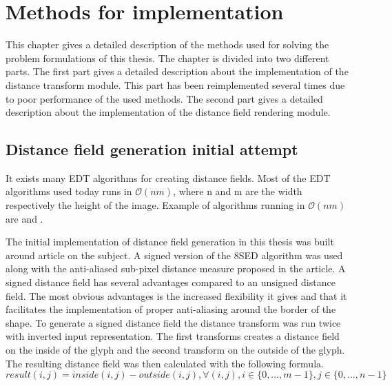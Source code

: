 \chapter{Methods for implementation}\label{cha:method_implementation}
This chapter gives a detailed description of the methods used for solving the problem formulations of this thesis. The chapter is divided into two different parts. The first part gives a detailed description about the implementation of the distance transform module. This part has been reimplemented several times due to poor performance of the used methods. The second part gives a detailed description about the implementation of the distance field rendering module.

\section{Distance field generation initial attempt}
It exists many EDT algorithms for creating distance fields. Most of the EDT algorithms used today runs in $\mathcal{O}(nm)$, where n and m are the width respectively the height of the image. Example of algorithms running in $\mathcal{O}(nm)$ are \citet{Danielsson} and \citet{meijster}.

The initial implementation of distance field generation in this thesis was built around \citet{Gustavson:2011} article on the subject. A signed version of the 8SED algorithm was used along with the anti-aliased sub-pixel distance measure proposed in the article. A signed distance field has several advantages compared to an unsigned distance field. The most obvious advantages is the increased flexibility it gives and that it facilitates the implementation of proper anti-aliasing around the border of the shape\citep{gustavson20122d}. To generate a signed distance field the distance transform was run twice with inverted input representation. The first transforms creates a distance field on the inside of the glyph and the second transform on the outside of the glyph. The resulting distance field was then calculated with the following formula.\vspace{\baselineskip}\newline
$result(i,j) = inside(i,j) - outside(i,j), \forall (i, j), i \in \{0,\dots, m-1\}, j \in \{0,\dots, n-1\}$ \vspace{\baselineskip}\newline
